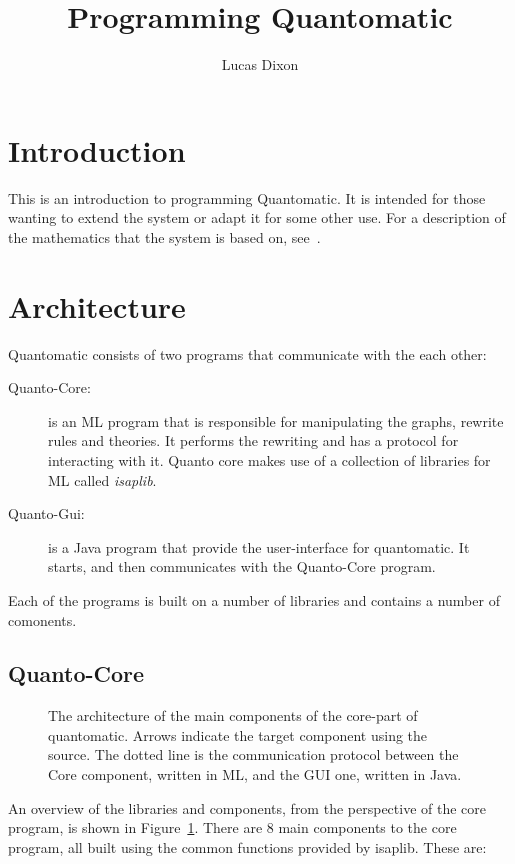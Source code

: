 \documentclass{article}
\title{Programming Quantomatic}
\author{Lucas Dixon}
\begin{document}
\maketitle

\section{Introduction}

This is an introduction to programming Quantomatic. It is intended for
those wanting to extend the system or adapt it for some other use. For
a description of the mathematics that the system is based on,
see~\cite{2010:DDK:DCM}.

\section{Architecture}

Quantomatic consists of two programs that communicate with the each
other:

\begin{description}
\item[Quanto-Core:] is an ML program that is responsible for
  manipulating the graphs, rewrite rules and theories. It performs the
  rewriting and has a protocol for interacting with it. Quanto core
  makes use of a collection of libraries for ML called \emph{isaplib}.
\item[Quanto-Gui:] is a Java program that provide the user-interface
  for quantomatic. It starts, and then communicates with the
  Quanto-Core program.
\end{description}

Each of the programs is built on a number of libraries and contains a
number of comonents. 

\subsection{Quanto-Core}

\begin{figure}[t]
\caption{The architecture of the main components of the core-part of
  quantomatic. Arrows indicate the target component using the
  source. The dotted line is the communication protocol between the
  Core component, written in ML, and the GUI one, written in Java.}
\label{fig:arch-overview1}
\end{figure}

An overview of the libraries and components, from the perspective of
the core program, is shown in Figure~\ref{fig:arch-overview1}. There
are 8 main components to the core program, all built using the common
functions provided by isaplib. These are:
\end{document}
